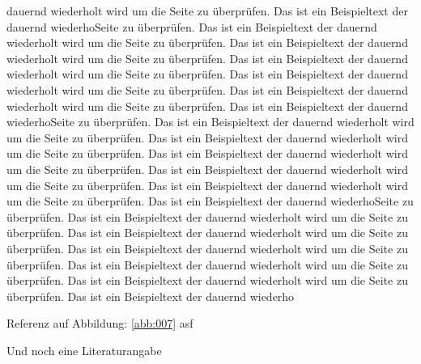 dauernd wiederholt wird um die Seite zu überprüfen. Das ist ein Beispieltext der dauernd wiederhoSeite zu überprüfen. Das ist ein Beispieltext der dauernd wiederholt wird um die Seite zu überprüfen. Das ist ein Beispieltext der dauernd wiederholt wird um die Seite zu überprüfen. Das ist ein Beispieltext der dauernd wiederholt wird um die Seite zu überprüfen. Das ist ein Beispieltext der dauernd wiederholt wird um die Seite zu überprüfen. Das ist ein Beispieltext der dauernd wiederholt wird um die Seite zu überprüfen. Das ist ein Beispieltext der dauernd wiederhoSeite zu überprüfen. Das ist ein Beispieltext der dauernd wiederholt wird um die Seite zu überprüfen. Das ist ein Beispieltext der dauernd wiederholt wird um die Seite zu überprüfen. Das ist ein Beispieltext der dauernd wiederholt wird um die Seite zu überprüfen. Das ist ein Beispieltext der dauernd wiederholt wird um die Seite zu überprüfen. Das ist ein Beispieltext der dauernd wiederholt wird um die Seite zu überprüfen. Das ist ein Beispieltext der dauernd wiederhoSeite zu überprüfen. Das ist ein Beispieltext der dauernd wiederholt wird um die Seite zu überprüfen. Das ist ein Beispieltext der dauernd wiederholt wird um die Seite zu überprüfen. Das ist ein Beispieltext der dauernd wiederholt wird um die Seite zu überprüfen. Das ist ein Beispieltext der dauernd wiederholt wird um die Seite zu überprüfen. Das ist ein Beispieltext der dauernd wiederholt wird um die Seite zu überprüfen. Das ist ein Beispieltext der dauernd wiederho




Referenz auf Abbildung: \ref{abb:007} asf

Und noch eine Literaturangabe \cite{hora06:_methoden_der_numerischen_umformtechnik}


